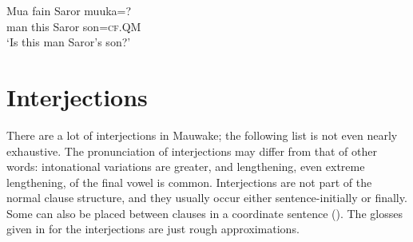 \ea%
\label{ex:x794}
\gll Mua fain Saror muuka=? \\
man this Saror son=\textsc{cf}.QM\\
\glt`Is this man Saror's son?'
\z

\section{Interjections}
{}
There are a lot of interjections in Mauwake; the following list is not even nearly exhaustive. The pronunciation of interjections may differ from that of other words: intonational variations are greater, and lengthening, even extreme lengthening, of the final vowel is common. Interjections are not part of the normal clause structure, and they usually occur either sentence-initially or finally. Some can also be placed between clauses in a coordinate sentence (). The glosses given in  for the interjections are just rough approximations. 

